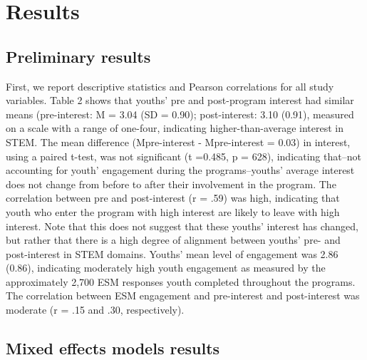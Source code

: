 \documentclass[man]{apa6}
\theoremstyle{definition}
\theoremstyle{definition}
\theoremstyle{definition}
\theoremstyle{remark}
\begin{document}
\section{Results}\label{results}

\subsection{Preliminary results}\label{preliminary-results}

First, we report descriptive statistics and Pearson correlations for all
study variables. Table 2 shows that youths' pre and post-program
interest had similar means (pre-interest: M = 3.04 (SD = 0.90);
post-interest: 3.10 (0.91), measured on a scale with a range of
one-four, indicating higher-than-average interest in STEM. The mean
difference (Mpre-interest - Mpre-interest = 0.03) in interest, using a
paired t-test, was not significant (t =0.485, p = 628), indicating
that--not accounting for youth' engagement during the programs--youths'
average interest does not change from before to after their involvement
in the program. The correlation between pre and post-interest (r = .59)
was high, indicating that youth who enter the program with high interest
are likely to leave with high interest. Note that this does not suggest
that these youths' interest has changed, but rather that there is a high
degree of alignment between youths' pre- and post-interest in STEM
domains. Youths' mean level of engagement was 2.86 (0.86), indicating
moderately high youth engagement as measured by the approximately 2,700
ESM responses youth completed throughout the programs. The correlation
between ESM engagement and pre-interest and post-interest was moderate
(r = .15 and .30, respectively).

\subsection{Mixed effects models
results}\label{mixed-effects-models-results}
\end{document}
